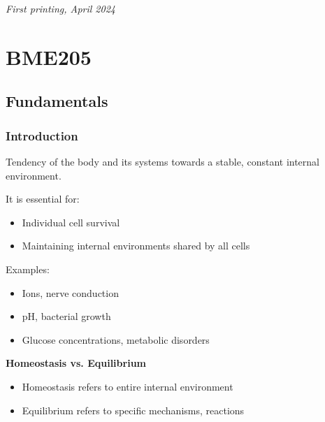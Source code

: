 \documentclass[11pt,fleqn]{book} %
\begin{document}
\noindent \textit{First printing, April 2024} %




\pagestyle{empty} %

\tableofcontents %

\cleardoublepage %

\pagestyle{fancy} %


\part{BME205}
\chapter{Fundamentals}
\section{Introduction}
\begin{definition}[Homeostasis]
    Tendency of the body and its systems towards a stable, constant internal environment. 
    
    It is essential for:
    \begin{itemize}
        \item Individual cell survival
        \item Maintaining internal environments shared by all cells
    \end{itemize}
    Examples:
    \begin{itemize}
        \item Ions, nerve conduction
        \item pH, bacterial growth
        \item Glucose concentrations, metabolic disorders
    \end{itemize}
    \textbf{Homeostasis vs. Equilibrium}

    \begin{itemize}
        \item Homeostasis refers to entire internal environment
        \item Equilibrium refers to specific mechanisms, reactions
    \end{itemize}
\end{definition}
\end{document}
